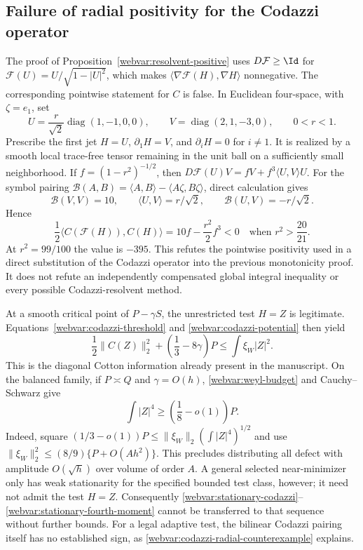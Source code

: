 \subsection{Failure of radial positivity for the Codazzi operator}

The proof of Proposition~\ref{webvar:resolvent-positive} uses
$D\mathcal F\ge\Id$ for
$\mathcal F(U)=U/\sqrt{1-|U|^2}$, which makes
$\langle\nabla\mathcal F(H),\nabla H\rangle$ nonnegative.
The corresponding pointwise statement for $C$ is false.
In Euclidean four-space, with $\zeta=e_1$, set
\[
 U=\frac r{\sqrt2}\operatorname{diag}(1,-1,0,0),\qquad
 V=\operatorname{diag}(2,1,-3,0),\qquad 0<r<1.
\]
Prescribe the first jet $H=U$, $\partial_1H=V$, and
$\partial_iH=0$ for $i\ne1$.  It is realized by a smooth local
trace-free tensor remaining in the unit ball on a sufficiently small
neighborhood.  If $f=(1-r^2)^{-1/2}$, then
$D\mathcal F(U)V=fV+f^3\langle U,V\rangle U$.
For the symbol pairing
$\mathcal B(A,B)=\langle A,B\rangle-\langle A\zeta,B\zeta\rangle$,
direct calculation gives
\[
 \mathcal B(V,V)=10,\qquad
 \langle U,V\rangle=r/\sqrt2,\qquad
 \mathcal B(U,V)=-r/\sqrt2.
\]
Hence
\begin{equation}\label{webvar:codazzi-radial-counterexample}
 \frac12\langle C(\mathcal F(H)),C(H)\rangle
       =10f-\frac{r^2}{2}f^3<0
       \quad\text{when }r^2>\frac{20}{21}.
\end{equation}
At $r^2=99/100$ the value is $-395$.
This refutes the pointwise positivity used in a direct substitution
of the Codazzi operator into the previous monotonicity proof.
It does not refute an independently compensated global integral
inequality or every possible Codazzi-resolvent method.

At a smooth critical point of $P-\gamma S$, the unrestricted test
$H=Z$ is legitimate.  Equations~\eqref{webvar:codazzi-threshold} and
\eqref{webvar:codazzi-potential} then yield
\begin{equation}\label{webvar:stationary-codazzi}
 \frac12\|C(Z)\|_2^2+
                 \left(\frac13-8\gamma\right)P
             \le\int\xi_W|Z|^2.
\end{equation}
This is the diagonal Cotton information already present in the
manuscript.  On the balanced family, if $P\asymp Q$ and
$\gamma=O(h)$, \eqref{webvar:weyl-budget} and Cauchy--Schwarz give
\begin{equation}\label{webvar:stationary-fourth-moment}
 \int|Z|^4\ge\left(\frac18-o(1)\right)P.
\end{equation}
Indeed, square
$(1/3-o(1))P\le\|\xi_W\|_2(\int|Z|^4)^{1/2}$
and use $\|\xi_W\|_2^2\le(8/9)\{P+O(Ah^2)\}$.
This precludes distributing all defect with amplitude $O(\sqrt h)$
over volume of order $A$.  A general selected near-minimizer only
has weak stationarity for the specified bounded test class, however;
it need not admit the test $H=Z$.  Consequently
\eqref{webvar:stationary-codazzi}--\eqref{webvar:stationary-fourth-moment}
cannot be transferred to that sequence without further bounds.
For a legal adaptive test, the bilinear Codazzi pairing itself has
no established sign, as \eqref{webvar:codazzi-radial-counterexample}
explains.

